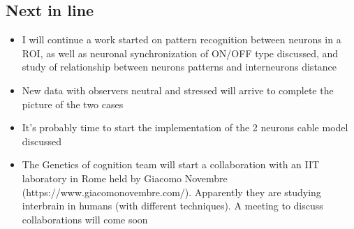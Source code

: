 \documentclass[a4paper]{article}
\begin{document}
	\subsection{Next in line}		
		
		\begin{itemize}
			
			\item I will continue a work started on pattern recognition between neurons in a ROI, as well as neuronal synchronization of ON/OFF type discussed, and study of relationship between neurons patterns and interneurons distance
			
			\item New data with observers neutral and stressed will arrive to complete the picture of the two cases
			
			\item It's probably time to start the implementation of the 2 neurons cable model discussed
			
			\item The Genetics of cognition team will start a collaboration with an IIT laboratory in Rome held by Giacomo Novembre (https://www.giacomonovembre.com/). Apparently they are studying interbrain in humans (with different techniques). A meeting to discuss collaborations will come soon
			
			
		\end{itemize}
		
		
		
		
		
		
		
	
	
\end{document}
